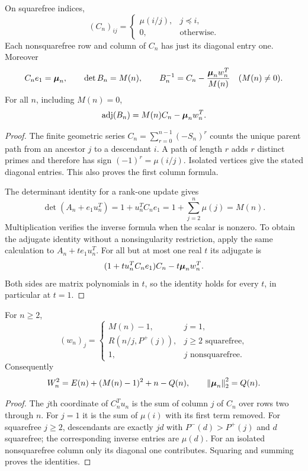 \begin{proposition}\label{def:inverse}
On squarefree indices,
\[
 (C_n)_{ij}=\begin{cases}\mu(i/j),&j\preceq i,\\0,&\text{otherwise}.
 \end{cases}
\]
Each nonsquarefree row and column of $C_n$ has just its diagonal entry one. Moreover
\begin{equation}\label{def:rankone}
 C_ne_1=\boldsymbol{\mu}_n,\qquad \det B_n=M(n),\qquad
 B_n^{-1}=C_n-\frac{\boldsymbol{\mu}_nw_n^T}{M(n)}\quad(M(n)\ne0).
\end{equation}
For all $n$, including $M(n)=0$,
\begin{equation}\label{def:adjugate}
 \operatorname{adj}(B_n)=M(n)C_n-\boldsymbol{\mu}_nw_n^T.
\end{equation}
\end{proposition}
\begin{proof}
The finite geometric series $C_n=\sum_{r=0}^{n-1}(-S_n)^r$ counts the unique parent path from an ancestor $j$ to a descendant $i$. A path of length $r$ adds $r$ distinct primes and therefore has sign $(-1)^r=\mu(i/j)$. Isolated vertices give the stated diagonal entries. This also proves the first column formula.

The determinant identity for a rank-one update gives
\[
 \det(A_n+e_1u_n^T)=1+u_n^TC_ne_1
 =1+\sum_{j=2}^n\mu(j)=M(n).
\]
Multiplication verifies the inverse formula when the scalar is nonzero. To obtain the adjugate identity without a nonsingularity restriction, apply the same calculation to $A_n+t e_1u_n^T$. For all but at most one real $t$ its adjugate is
\[
 (1+t u_n^TC_ne_1)C_n-t\boldsymbol{\mu}_nw_n^T.
\]
Both sides are matrix polynomials in $t$, so the identity holds for every $t$, in particular at $t=1$.
\end{proof}

\begin{proposition}\label{def:wnorm}
For $n\ge2$,
\[
 (w_n)_j=\begin{cases}
 M(n)-1,&j=1,\\
 R(n/j,P^+(j)),&j\ge2\text{ squarefree},\\
 1,&j\text{ nonsquarefree}.
 \end{cases}
\]
Consequently
\begin{equation}\label{def:wnormidentity}
 W_n^2=E(n)+(M(n)-1)^2+n-Q(n),\qquad
 \left\lVert\boldsymbol{\mu}_n\right\rVert_2^2=Q(n).
\end{equation}
\end{proposition}
\begin{proof}
The $j$th coordinate of $C_n^Tu_n$ is the sum of column $j$ of $C_n$ over rows two through $n$. For $j=1$ it is the sum of $\mu(i)$ with its first term removed. For squarefree $j\ge2$, descendants are exactly $jd$ with $P^-(d)>P^+(j)$ and $d$ squarefree; the corresponding inverse entries are $\mu(d)$. For an isolated nonsquarefree column only its diagonal one contributes. Squaring and summing proves the identities.
\end{proof}


